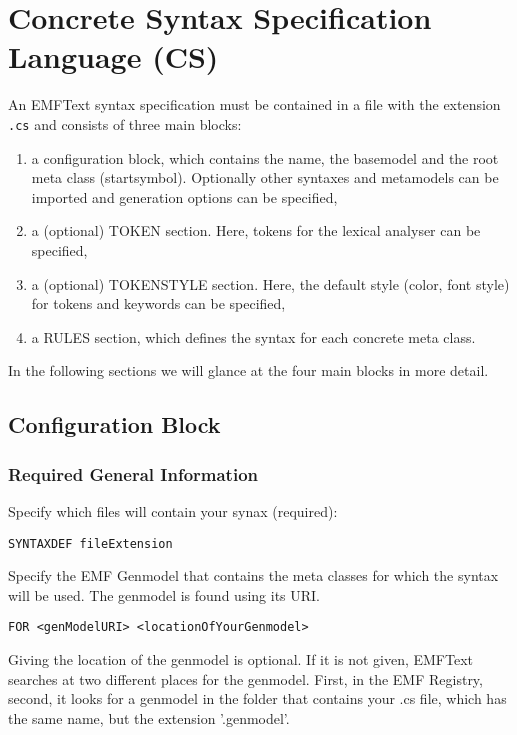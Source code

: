 \chapter{Concrete Syntax Specification Language (CS)}

An EMFText syntax specification must be contained in a file with the extension
\texttt{.cs} and consists of three main blocks:

\begin{enumerate}
  \item a configuration block, which contains the name, the basemodel and the
        root meta class (startsymbol). Optionally other syntaxes and metamodels
        can be imported and generation options can be specified,
  \item a (optional) TOKEN section. Here, tokens for the lexical analyser can be
        specified,
  \item a (optional) TOKENSTYLE section. Here, the default style (color, font
        style) for tokens and keywords can be specified,
  \item a RULES section, which defines the syntax for each concrete meta class.
\end{enumerate}

In the following sections we will glance at the four main blocks in more detail.

\section{Configuration Block}

\subsection{Required General Information}

Specify which files will contain your synax (required):

\begin{lstlisting}
SYNTAXDEF fileExtension
\end{lstlisting} 

Specify the EMF Genmodel that contains the meta classes for which the syntax will be used. The genmodel is found using its URI. 
 
\begin{lstlisting}
FOR <genModelURI> <locationOfYourGenmodel>
\end{lstlisting}

Giving the location of the genmodel is optional. If it is not given,
EMFText searches at two different places for the genmodel. First, in the EMF Registry, second, it looks for a genmodel in the folder that contains your .cs file, which has the same name, but the extension '.genmodel'.

